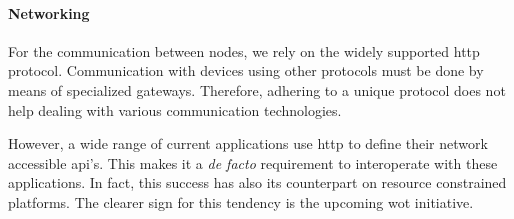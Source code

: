\paragraph{Networking}

For the communication between nodes, we rely on the widely supported \ac{http} protocol. %
Communication with devices using other protocols must be done by means of specialized gateways. %
Therefore, adhering to a unique protocol does not help dealing with various communication technologies.

However, a wide range of current applications use \ac{http} to define their network accessible \ac{api}'s. %
This makes it a \emph{de facto} requirement to interoperate with these applications. %
In fact, this success has also its counterpart on resource constrained platforms.
The clearer sign for this tendency is the upcoming \ac{wot} initiative.


